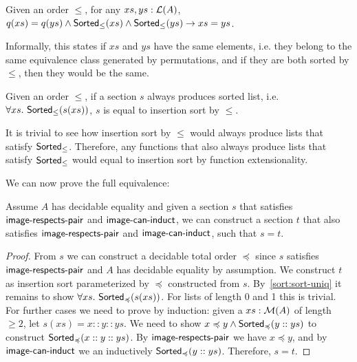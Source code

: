 \begin{proposition}
    Given an order $\leq$, for any $xs, ys : \mathcal{L}(A)$,
    $q(xs) = q(ys) \land \operatorname{\mathsf{Sorted}}_{\leq}(xs) \land \operatorname{\mathsf{Sorted}}_{\leq}(ys) \to xs = ys$.
\end{proposition}

Informally, this states if $xs$ and $ys$ have the same elements, i.e. they belong to the same
equivalence class generated by permutations, and if they are both sorted by $\leq$, then they would be the same.

\begin{corollary}\label{sort:sort-uniq}
    Given an order $\leq$,
    if a section $s$ always produces sorted list, i.e. $\forall xs.\,\operatorname{\mathsf{Sorted}}_{\leq}(s(xs))$,
    $s$ is equal to insertion sort by $\leq$.
\end{corollary}
It is trivial to see how insertion sort by $\leq$ would always produce lists that satisfy
$\operatorname{\mathsf{Sorted}}_{\leq}$. Therefore, any functions that also always produce lists that satisfy
$\operatorname{\mathsf{Sorted}}_{\leq}$ would equal to insertion sort by function extensionality.

We can now prove the full equivalence:
\begin{proposition}\label{sort:s2o2s}
    Assume $A$ has decidable equality and given a section $s$ that satisfies $\operatorname{\mathsf{image-respects-pair}}$ and $\operatorname{\mathsf{image-can-induct}}$,
    we can construct a section $t$ that also satisfies $\operatorname{\mathsf{image-respects-pair}}$ and $\operatorname{\mathsf{image-can-induct}}$, such that $s = t$.
\end{proposition}
\begin{proof}
    From $s$ we can construct a decidable total order $\preccurlyeq$ since $s$ satisfies
    $\operatorname{\mathsf{image-respects-pair}}$ and $A$ has decidable equality by assumption.
    We construct $t$ as insertion sort parameterized by $\preccurlyeq$ constructed from $s$.
    By~\cref{sort:sort-uniq} it remains to show $\forall xs.\,\operatorname{\mathsf{Sorted}}_{\preccurlyeq}(s(xs))$.
    For lists of length 0 and 1 this is trivial. For further cases we need to prove by induction:
    given a $xs : \mathcal{M}(A)$ of length $\geq 2$, let $s(xs) = x :: y :: ys$. We need to show
    $x \preccurlyeq y \land \operatorname{\mathsf{Sorted}}_{\preccurlyeq}(y :: ys)$ to construct
    $\operatorname{\mathsf{Sorted}}_{\preccurlyeq}(x :: y :: ys)$.
    By $\operatorname{\mathsf{image-respects-pair}}$ we have $x \preccurlyeq y$, and by $\operatorname{\mathsf{image-can-induct}}$ we an
    inductively $\operatorname{\mathsf{Sorted}}_{\preccurlyeq}(y :: ys)$.
    Therefore, $s = t$.
\end{proof}


